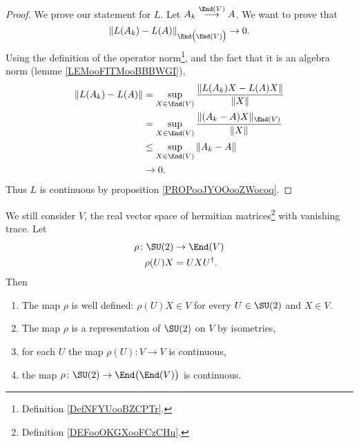 \begin{proof}
	We prove our statement for \( L\). Let \( A_k\stackrel{\End(V)}{\longrightarrow}A\). We want to prove that
	\begin{equation}
		\| L(A_k)-L(A) \|_{\End\big( \End(V) \big)}\to 0.
	\end{equation}
	Using the definition of the operator norm\footnote{Definition \ref{DefNFYUooBZCPTr}.}, and the fact that it is an algebra norm (lemme \ref{LEMooFITMooBBBWGI}),
	\begin{subequations}
		\begin{align}
			\| L(A_k)-L(A) \| & =\sup_{X\in \End(V)}\frac{ \| L(A_k)X-L(A)X \| }{ \| X \| }      \\
			                  & =\sup_{X\in \End(V)}\frac{ \| (A_k-A)X \|_{\End(V)} }{ \| X \| } \\
			                  & \leq \sup_{X\in\End(V)}\| A_k-A \|                               \\
			                  & \to 0.
		\end{align}
	\end{subequations}
	Thus \( L\) is continuous by proposition \ref{PROPooJYOOooZWocoq}.
\end{proof}

\begin{proposition}     \label{PROPooRQUZooAoZzwx}
	We still consider \( V\), the real vector space of hermitian matrices\footnote{Definition \ref{DEFooOKGXooFCzCHu}.} with vanishing trace. Let
	\begin{equation}
		\begin{aligned}
			\rho\colon \SU(2) & \to \End(V)  \\
			\rho(U)X          & =UXU^{\dag}.
		\end{aligned}
	\end{equation}
	Then
	\begin{enumerate}
		\item           \label{ITEMooLZBSooZUQGgJ}
		      The map \( \rho\) is well defined: \( \rho(U)X\in V\) for every \( U\in \SU(2)\) and \( X\in V\).
		\item
		      The map \( \rho\) is a representation of \( \SU(2)\) on \( V\) by isometries,
		\item       \label{ITEMooBZUQooNXNVfs}
		      for each \( U\) the map \( \rho(U)\colon V\to V\) is continuous,
		\item       \label{ITEMooGHZYooQuabWb}
		      the map \( \rho\colon \SU(2)\to \End\big( \End(V)\big) \) is continuous.
	\end{enumerate}
\end{proposition}

